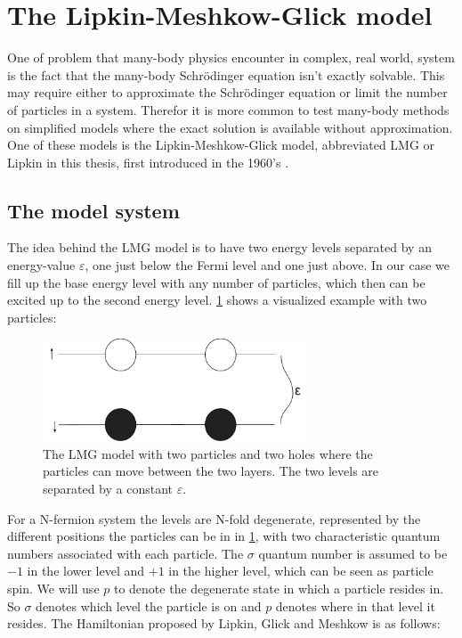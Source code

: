 \section{The Lipkin-Meshkow-Glick model}

One of problem that many-body physics encounter in complex, real world, system is the fact that the many-body Schrödinger equation isn't exactly solvable. This may require either to approximate the Schrödinger equation or limit the number of particles in a system. Therefor it is more common to test many-body methods on simplified models where the exact solution is available without approximation. One of these models is the Lipkin-Meshkow-Glick model, abbreviated LMG or Lipkin in this thesis, first introduced in the 1960's \cite{LIPKIN1965188}.
\subsection{The model system}

The idea behind the LMG model is to have two energy levels separated by an energy-value $\varepsilon$, one just below the Fermi level and one just above. In our case we fill up the base energy level with any number of particles, which then can be excited up to the second energy level. \ref{fig:lipkinnumbered} shows a visualized example with two particles:

\begin{figure}[H]
    \centering
    \includegraphics[width=0.7\textwidth]{Figures/Drawn/Lipkin/Lipkinstart22.pdf}
    \caption{The LMG model with two particles and two holes where the particles can move between the two layers. The two levels are separated by a constant $\varepsilon$. }
    \label{fig:lipkinnumbered}
\end{figure}

For a N-fermion system the levels are N-fold degenerate, represented by the different positions the particles can be in in \ref{fig:lipkinnumbered}, with two characteristic quantum numbers associated with each particle. The $\sigma$ quantum number is assumed to be $-1$ in the lower level and $+1$ in the higher level, which can be seen as particle spin. We will use $p$ to denote the degenerate state in which a particle resides in. So $\sigma$ denotes which level the particle is on and $p$ denotes where in that level it resides. The Hamiltonian proposed by Lipkin, Glick and Meshkow is as follows:

